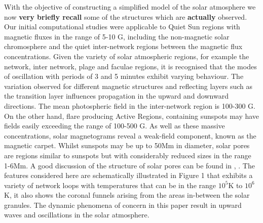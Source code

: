 \documentclass[physics,article,submit,pdftex,moreauthors]{Definitions/mdpi}
\begin{document}
%
With the objective of constructing a simplified model of the solar atmosphere we now {\bf very briefly recall} some of the structures which are {\bf actually} observed. Our initial computational studies were applicable to Quiet Sun regions with magnetic fluxes in the range of 5-10 G, including the non-magnetic solar chromosphere and the quiet inter-network regions between the magnetic flux concentrations. Given the variety of solar atmospheric regions, for example the network, inter network, plage and faculae regions, it is recognised that the modes of oscillation with periods of 3 and 5 minutes exhibit varying behaviour. The variation observed for different magnetic structures and reflecting layers such as the transition layer influences propagation in the upward and downward directions. The mean photospheric field in the inter-network region is 100-300 G. 
 On the other hand, flare producing Active Regions, containing sunspots may have fields easily  exceeding the %
range of 100-500 G. As well as these massive concentrations, solar magnetograms reveal 
 a weak-field component, known as the magnetic carpet. Whilst sunspots may be up to 50Mm in diameter, solar pores are regions similar to sunspots but with considerably reduced sizes in the range 1-6Mm. A good discussion of the structure of  solar pores can be found in \cite{Simon1970}, \cite{Cameron2007}. The features considered here are  schematically illustrated in Figure 1 that exhibits a  variety of network loops with temperatures  that  can be in the range $10^{5}$K to $10^{6}$K, it also shows the coronal funnels arising from the areas in-between the solar granules. The  dynamic phenomena of concern in this paper result in  upward waves and oscillations in the solar atmosphere. 
\end{document}

